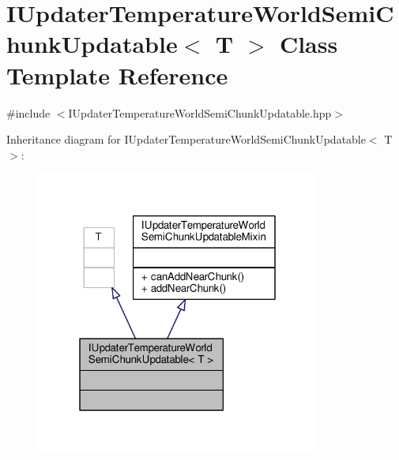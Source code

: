 \hypertarget{class_i_updater_temperature_world_semi_chunk_updatable}{\section{I\-Updater\-Temperature\-World\-Semi\-Chunk\-Updatable$<$ T $>$ Class Template Reference}
\label{class_i_updater_temperature_world_semi_chunk_updatable}
}


{\ttfamily \#include $<$I\-Updater\-Temperature\-World\-Semi\-Chunk\-Updatable.\-hpp$>$}



Inheritance diagram for I\-Updater\-Temperature\-World\-Semi\-Chunk\-Updatable$<$ T $>$\-:
\nopagebreak
\begin{figure}[H]
\begin{center}
\leavevmode
\includegraphics[width=265pt]{class_i_updater_temperature_world_semi_chunk_updatable__inherit__graph}
\end{center}
\end{figure}


